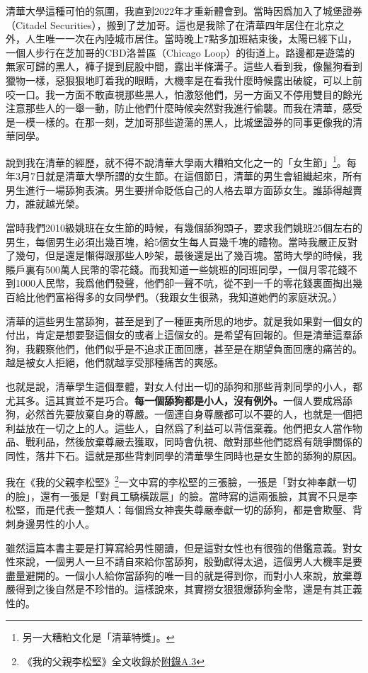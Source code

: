清華大學這種可怕的氛圍，我直到2022年才重新體會到。當時因爲加入了城堡證券（Citadel Securities），搬到了芝加哥。這也是我除了在清華四年居住在北京之外，人生唯一一次在內陸城市居住。當時晚上7點多加班結束後，太陽已經下山，一個人步行在芝加哥的CBD洛普區（Chicago Loop）的街道上。路邊都是遊蕩的無家可歸的黑人，褲子提到屁股中間，露出半條溝子。這些人看到我，像鬣狗看到獵物一樣，惡狠狠地盯着我的眼睛，大機率是在看我什麼時候露出破綻，可以上前咬一口。我一方面不敢直視那些黑人，怕激怒他們，另一方面又不停用雙目的餘光注意那些人的一舉一動，防止他們什麼時候突然對我進行偷襲。而我在清華，感受是一模一樣的。在那一刻，芝加哥那些遊蕩的黑人，比城堡證券的同事更像我的清華同學。

說到我在清華的經歷，就不得不說清華大學兩大糟粕文化之一的「女生節」\footnote{另一大糟粕文化是「清華特獎」。}。每年3月7日就是清華大學所謂的女生節。在這個節日，清華的男生會組織起來，所有男生進行一場舔狗表演。男生要拼命貶低自己的人格去單方面舔女生。誰舔得越賣力，誰就越光榮。

當時我們2010級姚班在女生節的時候，有幾個舔狗頭子，要求我們姚班25個左右的男生，每個男生必須出幾百塊，給5個女生每人買幾千塊的禮物。當時我嚴正反對了幾句，但是還是懶得跟那些人吵架，最後還是出了幾百塊。當時大學的時候，我賬戶裏有500萬人民幣的零花錢。而我知道一些姚班的同班同學，一個月零花錢不到1000人民幣，我爲他們發聲，他們卻一聲不吭，從不到一千的零花錢裏面掏出幾百給比他們富裕得多的女同學們。（我跟女生很熟，我知道她們的家庭狀況。）

清華的這些男生當舔狗，甚至是到了一種匪夷所思的地步。就是我如果對一個女的付出，肯定是想要娶這個女的或者上這個女的。是希望有回報的。但是清華這羣舔狗，我觀察他們，他們似乎是不追求正面回應，甚至是在期望負面回應的痛苦的。越是被女人拒絕，他們就越享受那種痛苦的爽感。

也就是說，清華學生這個羣體，對女人付出一切的舔狗和那些背刺同學的小人，都尤其多。這其實並不是巧合。\textbf{每一個舔狗都是小人，沒有例外。}一個人要成爲舔狗，必然首先要放棄自身的尊嚴。一個連自身尊嚴都可以不要的人，也就是一個把利益放在一切之上的人。這些人，自然爲了利益可以背信棄義。他們把女人當作物品、戰利品，然後放棄尊嚴去獲取，同時會仇視、敵對那些他們認爲有競爭關係的同性，落井下石。這就是那些背刺同學的清華學生同時也是女生節的舔狗的原因。

我在《我的父親李松堅》\footnote{《我的父親李松堅》全文收錄於\hyperref[3faces]{附錄A.3}}一文中寫的李松堅的三張臉，一張是「對女神奉獻一切的臉」，還有一張是「對員工驕橫跋扈」的臉。當時寫的這兩張臉，其實不只是李松堅，而是代表一整類人：每個爲女神喪失尊嚴奉獻一切的舔狗，都是會欺壓、背刺身邊男性的小人。

雖然這篇本書主要是打算寫給男性閱讀，但是這對女性也有很強的借鑑意義。對女性來說，一個男人一旦不請自來給你當舔狗，殷勤獻得太過，這個男人大機率是要盡量避開的。一個小人給你當舔狗的唯一目的就是得到你，而對小人來說，放棄尊嚴得到之後自然是不珍惜的。這樣說來，其實撈女狠狠爆舔狗金幣，還是有其正義性的。